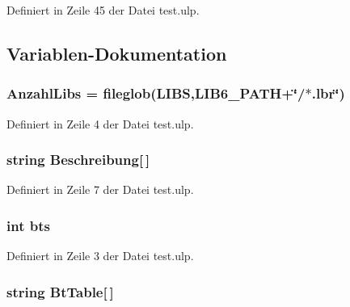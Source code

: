 Definiert in Zeile 45 der Datei test.\+ulp.



\subsection{Variablen-\/\+Dokumentation}
\hypertarget{test_8ulp_ae8b208e90c3b4ab20d7c823612b1a0f7}{}
\subsubsection[{Anzahl\+Libs}]{\setlength{\rightskip}{0pt plus 5cm}Anzahl\+Libs = fileglob({\bf L\+I\+B\+S},{\bf L\+I\+B6\+\_\+\+P\+A\+T\+H}+\char`\"{}/$\ast$.lbr\char`\"{})}\label{test_8ulp_ae8b208e90c3b4ab20d7c823612b1a0f7}


Definiert in Zeile 4 der Datei test.\+ulp.

\hypertarget{test_8ulp_a0165df64e95135bade509c58bdb353f1}{}
\subsubsection[{Beschreibung}]{\setlength{\rightskip}{0pt plus 5cm}string Beschreibung\mbox{[}$\,$\mbox{]}}\label{test_8ulp_a0165df64e95135bade509c58bdb353f1}


Definiert in Zeile 7 der Datei test.\+ulp.

\hypertarget{test_8ulp_a00c6cb851706bdde7570b25efe80733a}{}
\subsubsection[{bts}]{\setlength{\rightskip}{0pt plus 5cm}int bts}\label{test_8ulp_a00c6cb851706bdde7570b25efe80733a}


Definiert in Zeile 3 der Datei test.\+ulp.

\hypertarget{test_8ulp_af0d191df3e333660839f50e87bc098c8}{}
\subsubsection[{Bt\+Table}]{\setlength{\rightskip}{0pt plus 5cm}string Bt\+Table\mbox{[}$\,$\mbox{]}}\label{test_8ulp_af0d191df3e333660839f50e87bc098c8}


